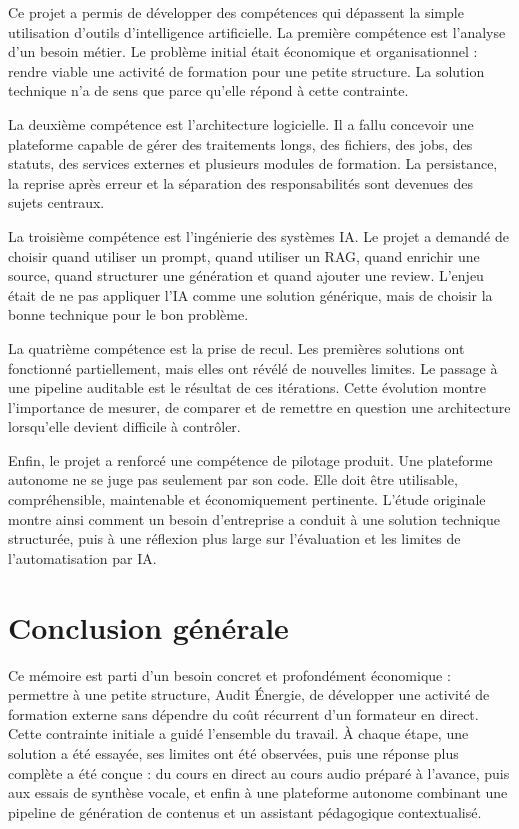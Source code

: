 \documentclass[12pt,a4paper]{article}
\begin{document}
Ce projet a permis de développer des compétences qui dépassent la simple utilisation
d'outils d'intelligence artificielle. La première compétence est l'analyse d'un besoin métier.
Le problème initial était économique et organisationnel : rendre viable une activité de
formation pour une petite structure. La solution technique n'a de sens que parce qu'elle
répond à cette contrainte.

La deuxième compétence est l'architecture logicielle. Il a fallu concevoir une plateforme
capable de gérer des traitements longs, des fichiers, des jobs, des statuts, des services
externes et plusieurs modules de formation. La persistance, la reprise après erreur et la
séparation des responsabilités sont devenues des sujets centraux.

La troisième compétence est l'ingénierie des systèmes IA. Le projet a demandé de choisir
quand utiliser un prompt, quand utiliser un RAG, quand enrichir une source, quand
structurer une génération et quand ajouter une review. L'enjeu était de ne pas appliquer
l'IA comme une solution générique, mais de choisir la bonne technique pour le bon
problème.

La quatrième compétence est la prise de recul. Les premières solutions ont fonctionné
partiellement, mais elles ont révélé de nouvelles limites. Le passage à une pipeline
auditable est le résultat de ces itérations. Cette évolution montre l'importance de mesurer,
de comparer et de remettre en question une architecture lorsqu'elle devient difficile à
contrôler.

Enfin, le projet a renforcé une compétence de pilotage produit. Une plateforme autonome
ne se juge pas seulement par son code. Elle doit être utilisable, compréhensible, maintenable
et économiquement pertinente. L'étude originale montre ainsi comment un besoin
d'entreprise a conduit à une solution technique structurée, puis à une réflexion plus large
sur l'évaluation et les limites de l'automatisation par IA.

\clearpage
{}
{}
\section*{Conclusion générale}

Ce mémoire est parti d'un besoin concret et profondément économique : permettre à une
petite structure, Audit Énergie, de développer une activité de formation externe sans dépendre
du coût récurrent d'un formateur en direct. Cette contrainte initiale a guidé l'ensemble du
travail. À chaque étape, une solution a été essayée, ses limites ont été observées, puis une
réponse plus complète a été conçue : du cours en direct au cours audio préparé à l'avance, puis
aux essais de synthèse vocale, et enfin à une plateforme autonome combinant une pipeline de
génération de contenus et un assistant pédagogique contextualisé.
\end{document}

